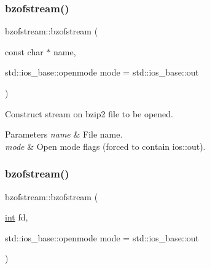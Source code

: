 \mbox{\label{classbzofstream_a039338b800e61a5f834a0bdb971eba77}} 
\subsubsection{\texorpdfstring{bzofstream()}{bzofstream()}\hspace{0.1cm}{\footnotesize\ttfamily [2/3]}}
{\footnotesize\ttfamily bzofstream\+::bzofstream (\begin{DoxyParamCaption}\item[{const char $\ast$}]{name,  }\item[{std\+::ios\+\_\+base\+::openmode}]{mode = {\ttfamily std\+:\+:ios\+\_\+base\+:\+:out} }\end{DoxyParamCaption})\hspace{0.3cm}{\ttfamily [explicit]}}



Construct stream on bzip2 file to be opened. 


\begin{DoxyParams}{Parameters}
{\em name} & File name. \\
\hline
{\em mode} & Open mode flags (forced to contain ios\+::out). \\
\hline
\end{DoxyParams}
\mbox{\label{classbzofstream_a5999079b494827ad2c653c2d045f0e9b}} 
\subsubsection{\texorpdfstring{bzofstream()}{bzofstream()}\hspace{0.1cm}{\footnotesize\ttfamily [3/3]}}
{\footnotesize\ttfamily bzofstream\+::bzofstream (\begin{DoxyParamCaption}\item[{\hyperlink{lp__lib_8h_adeb9ec6400320e4923ac9d836d509ddb}{int}}]{fd,  }\item[{std\+::ios\+\_\+base\+::openmode}]{mode = {\ttfamily std\+:\+:ios\+\_\+base\+:\+:out} }\end{DoxyParamCaption})\hspace{0.3cm}{\ttfamily [explicit]}}



